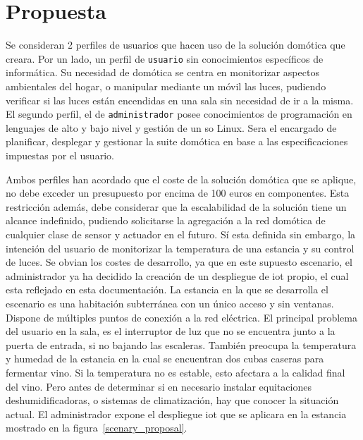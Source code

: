 \cleardoublepage

\chapter{Propuesta}
\label{ch:Capitulo3}

Se consideran 2 perfiles de usuarios que hacen uso de la solución domótica que creara. Por un lado, un  perfil de \verb|usuario| sin conocimientos específicos de informática. Su necesidad de domótica se centra en monitorizar aspectos ambientales del hogar, o manipular mediante un móvil las luces, pudiendo verificar si las luces están encendidas en una sala sin necesidad de ir a la misma. El segundo perfil, el de \verb|administrador| posee conocimientos de programación en lenguajes de alto y bajo nivel y gestión de un \gls{so} Linux. Sera el encargado de planificar, desplegar y gestionar la suite domótica en base a las especificaciones impuestas por el usuario.

\vspace{1cm}

Ambos perfiles han acordado que el coste de la solución domótica que se aplique, no debe exceder un presupuesto por encima de 100 euros en componentes. Esta restricción además, debe considerar que la escalabilidad de la solución tiene un alcance indefinido, pudiendo solicitarse la agregación a la red domótica de cualquier clase de sensor y actuador en el futuro. Sí esta definida sin embargo, la intención del usuario de monitorizar la temperatura de una estancia y su control de luces. Se obvian los costes de desarrollo, ya que en este supuesto escenario, el administrador ya ha decidido la creación de un despliegue de \gls{iot} propio, el cual esta reflejado en esta documentación. La estancia en la que se desarrolla el escenario es una habitación subterránea con un único acceso y sin ventanas. Dispone de múltiples puntos de conexión a la red eléctrica. El principal problema del usuario en la sala, es el interruptor de luz que no se encuentra junto a la puerta de entrada, si no bajando las escaleras. También preocupa la temperatura y humedad de la estancia en la cual se encuentran dos cubas caseras para fermentar vino. Si la temperatura no es estable, esto afectara a la calidad final del vino. Pero antes de determinar si en necesario instalar equitaciones deshumidificadoras, o sistemas de climatización, hay que conocer la situación actual. El administrador expone el despliegue \gls{iot} que se aplicara en la estancia mostrado en la figura~\ref{scenary_proposal}.

